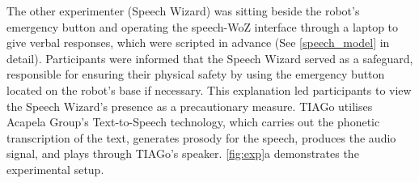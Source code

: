 The other experimenter (Speech Wizard) was sitting beside the robot's emergency button and operating the speech-WoZ interface through a laptop to give verbal responses, which were scripted in advance (See \autoref{speech_model} in detail). Participants were informed that the Speech Wizard served as a safeguard, responsible for ensuring their physical safety by using the emergency button located on the robot's base if necessary. This explanation led participants to view the Speech Wizard’s presence as a precautionary measure. TIAGo utilises Acapela Group's Text-to-Speech technology, which carries out the phonetic transcription of the text, generates prosody for the speech, produces the audio signal, and plays through TIAGo's speaker. \autoref{fig:exp}a demonstrates the experimental setup.


\begin{table*}[t]
\caption{Examples of participants' requests, interpretations, and robot's responses in different Speech Modes. The request examples are from \autoref{fig:teaser}. (P: participant; R: robot)}
\label{tb:example}
\end{table*}
